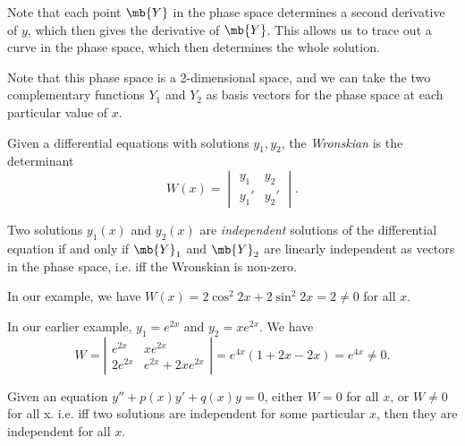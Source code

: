 \documentclass[a4paper]{article}
\begin{document}
Note that each point $\mb{Y}$ in the phase space determines a second derivative of $y$, which then gives the derivative of $\mb{Y}$. This allows us to trace out a curve in the phase space, which then determines the whole solution.

Note that this phase space is a 2-dimensional space, and we can take the two complementary functions $Y_1$ and $Y_2$ as basis vectors for the phase space at each particular value of $x$.

\begin{defi}[Wronskian]
  Given a differential equations with solutions $y_1, y_2$, the \emph{Wronskian} is the determinant
\[
W(x) = \begin{vmatrix}y_1 & y_2 \\ y_1' & y_2'\end{vmatrix}.
\]
\end{defi}
\begin{defi}
  Two solutions $y_1(x)$ and $y_2(x)$ are \emph{independent} solutions of the differential equation if and only if $\mb{Y}_1$  and $\mb{Y}_2$  are linearly independent as vectors in the phase space, i.e. iff the Wronskian is non-zero.
\end{defi}

In our example, we have $W(x) = 2\cos^2 2x + 2\sin^2 2x = 2 \not= 0$ for all $x$.

\begin{eg}
  In our earlier example, $y_1 = e^{2x}$ and $y_2 = xe^{2x}$. We have 
  \[
  W = \left|\begin{matrix} e^{2x} & xe^{2x}\\ 2e^{2x} & e^{2x} + 2xe^{2x} \end{matrix}\right| = e^{4x}(1 + 2x - 2x) = e^{4x} \not= 0.
  \]
\end{eg}

\begin{thm}
  Given an equation $y'' + p(x)y' + q(x) y = 0$, either $W = 0$ for all $x$, or $W \not= 0$ for all x. i.e. iff two solutions are independent for some particular $x$, then they are independent for all $x$.
\end{thm}
\end{document}
